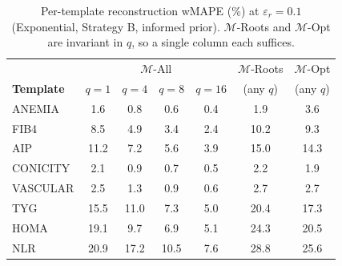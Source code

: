 \begin{table}[h]
\centering
\setlength{\tabcolsep}{4pt}
\small
\caption{Per-template reconstruction wMAPE (\%) at $\varepsilon_r = 0.1$ (Exponential, Strategy B, informed prior). $\mathcal{M}$-Roots and $\mathcal{M}$-Opt are invariant in $q$, so a single column each suffices.}
\label{tab:rq2_per_template}
\begin{tabular}{l|cccc|cc}
\toprule
& \multicolumn{4}{c|}{$\mathcal{M}$-All} & $\mathcal{M}$-Roots & $\mathcal{M}$-Opt \\
\textbf{Template} & $q{=}1$ & $q{=}4$ & $q{=}8$ & $q{=}16$ & (any $q$) & (any $q$) \\
\midrule
ANEMIA & 1.6 & 0.8 & 0.6 & 0.4 & 1.9 & 3.6 \\
FIB4 & 8.5 & 4.9 & 3.4 & 2.4 & 10.2 & 9.3 \\
AIP & 11.2 & 7.2 & 5.6 & 3.9 & 15.0 & 14.3 \\
CONICITY & 2.1 & 0.9 & 0.7 & 0.5 & 2.2 & 1.9 \\
VASCULAR & 2.5 & 1.3 & 0.9 & 0.6 & 2.7 & 2.7 \\
TYG & 15.5 & 11.0 & 7.3 & 5.0 & 20.4 & 17.3 \\
HOMA & 19.1 & 9.7 & 6.9 & 5.1 & 24.3 & 20.5 \\
NLR & 20.9 & 17.2 & 10.5 & 7.6 & 28.8 & 25.6 \\
\bottomrule
\end{tabular}
\end{table}
